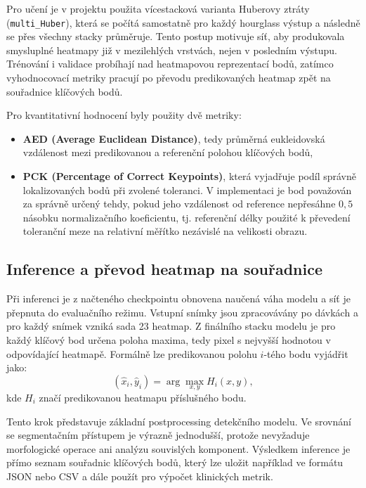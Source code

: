 \documentclass[male,czech,api_bc]{kitheses}
\begin{document}
Pro učení je v projektu použita vícestacková varianta Huberovy ztráty (\texttt{multi\_Huber}), která se počítá samostatně pro každý hourglass výstup a následně se přes všechny stacky průměruje. Tento postup motivuje síť, aby produkovala smysluplné heatmapy již v mezilehlých vrstvách, nejen v posledním výstupu. Trénování i validace probíhají nad heatmapovou reprezentací bodů, zatímco vyhodnocovací metriky pracují po převodu predikovaných heatmap zpět na souřadnice klíčových bodů.

Pro kvantitativní hodnocení byly použity dvě metriky:
\begin{itemize}
    \item \textbf{AED (Average Euclidean Distance)}, tedy průměrná eukleidovská vzdálenost mezi predikovanou a referenční polohou klíčových bodů,
    \item \textbf{PCK (Percentage of Correct Keypoints)}, která vyjadřuje podíl správně lokalizovaných bodů při zvolené toleranci. V implementaci je bod považován za správně určený tehdy, pokud jeho vzdálenost od reference nepřesáhne $0{,}5$ násobku normalizačního koeficientu, tj. referenční délky použité k převedení toleranční meze na relativní měřítko nezávislé na velikosti obrazu.
\end{itemize}

\subsection{Inference a převod heatmap na souřadnice}

Při inferenci je z načteného checkpointu obnovena naučená váha modelu a síť je přepnuta do evaluačního režimu. Vstupní snímky jsou zpracovávány po dávkách a pro každý snímek vzniká sada 23 heatmap. Z finálního stacku modelu je pro každý klíčový bod určena poloha maxima, tedy pixel s nejvyšší hodnotou v odpovídající heatmapě. Formálně lze predikovanou polohu $i$-tého bodu vyjádřit jako:
\begin{equation}
(\hat{x}_i, \hat{y}_i) = \arg\max_{x,y} H_i(x,y),
\end{equation}
kde $H_i$ značí predikovanou heatmapu příslušného bodu.

Tento krok představuje základní postprocessing detekčního modelu. Ve srovnání se segmentačním přístupem je výrazně jednodušší, protože nevyžaduje morfologické operace ani analýzu souvislých komponent. Výsledkem inference je přímo seznam souřadnic klíčových bodů, který lze uložit například ve formátu JSON nebo CSV a dále použít pro výpočet klinických metrik.
\end{document}
